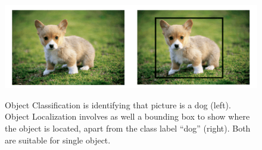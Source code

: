 \documentclass[12pt,a4paper,table,dvipsnames,tikz]{report}
\newcommand{\alleg}{\enquote}
\begin{document}
	\begin{figure}[h!]
		\caption{Object Classification is identifying that picture is a dog (left). Object 
			Localization involves as well a bounding box to show where the object is located, 
			apart from the class label \alleg{dog} (right). Both are suitable for single object.}
		\centering
		\includegraphics[width=\textwidth]{clas_loc}
		\label{fig:clas}
	\end{figure}
	
\end{document}

